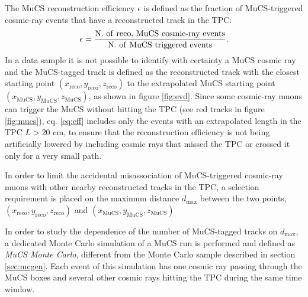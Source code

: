 \documentclass[a4paper,11pt]{article}
\def\myhyphen{{\hbox{-}}}
\begin{document}
The MuCS reconstruction efficiency $\epsilon$ is defined as the fraction of MuCS-triggered cosmic-ray events that have a reconstructed track in the TPC:
\begin{equation}\label{eq:eff}
  \epsilon = \frac{\mathrm{N.~of~reco.~MuCS~cosmic\myhyphen ray~events}}{\mathrm{N.~of~MuCS~triggered~events}}.
\end{equation}
In a data sample it is not possible to identify with certainty a MuCS cosmic ray and the MuCS-tagged track is defined as the reconstructed track with the closest starting point $(x_{\mathrm{reco}},y_{\mathrm{reco}},z_{\mathrm{reco}})$ to the extrapolated MuCS starting point $(x_{\mathrm{MuCS}},y_{\mathrm{MuCS}},z_{\mathrm{MuCS}})$, as shown in figure \ref{fig:evd}. Since some cosmic-ray muons can trigger the MuCS without hitting the TPC (see red tracks in figure \ref{fig:mucs}), eq. \eqref{eq:eff} includes only the events with an extrapolated length in the TPC $L > 20$ cm, to ensure that the reconstruction efficiency is not being artificially lowered by including cosmic rays that missed the TPC or crossed it only for a very small path.

In order to limit the accidental misassociation of MuCS-triggered cosmic-ray muons with other nearby reconstructed tracks in the TPC, a selection requirement is placed on the maximum distance $d_{\mathrm{max}}$ between the two points, $(x_{\mathrm{reco}},y_{\mathrm{reco}},z_{\mathrm{reco}})$ and $(x_{\mathrm{MuCS}},y_{\mathrm{MuCS}},z_{\mathrm{MuCS}})$


In order to study the dependence of the number of MuCS-tagged tracks on $d_{\mathrm{max}}$, a dedicated Monte Carlo simulation of a MuCS run is performed and defined as \emph{MuCS Monte Carlo}, different from the Monte Carlo sample described in section \ref{sec:mcgen}. Each event of this simulation has one cosmic ray passing through the MuCS boxes and several other cosmic rays hitting the TPC during the same time window.
\end{document}
